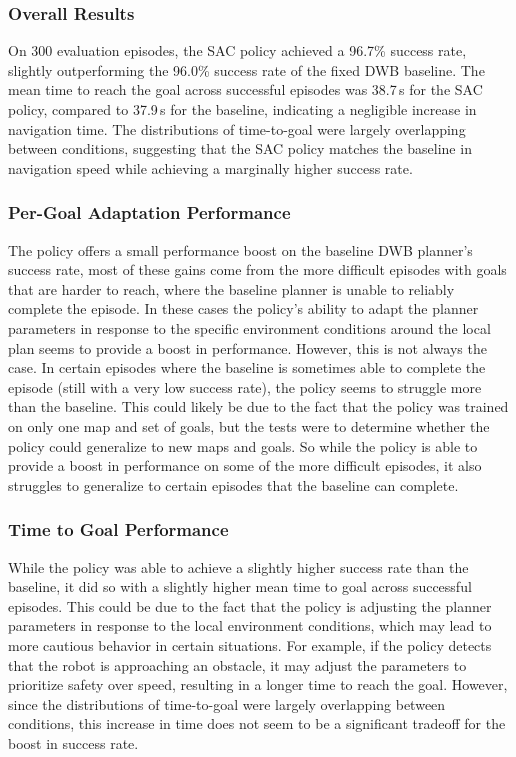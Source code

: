 \documentclass[conference]{IEEEtran}
\begin{document}
        \subsubsection{Overall Results}
        On 300 evaluation episodes, the SAC policy achieved a 96.7\% success rate, slightly outperforming the 96.0\% success rate of the fixed DWB baseline. The mean time to reach the goal across successful episodes was 38.7\,s for the SAC policy, compared to 37.9\,s for the baseline, indicating a negligible increase in navigation time. The distributions of time-to-goal were largely overlapping between conditions, suggesting that the SAC policy matches the baseline in navigation speed while achieving a marginally higher success rate.

        \subsubsection{Per-Goal Adaptation Performance}
        The policy offers a small performance boost on the baseline DWB planner's success rate, most of these gains come from the more difficult episodes with goals that are harder to reach, where the baseline planner is unable to reliably complete the episode. In these cases the policy's ability to adapt the planner parameters in response to the specific environment conditions around the local plan seems to provide a boost in performance. However, this is not always the case. In certain episodes where the baseline is sometimes able to complete the episode (still with a very low success rate), the policy seems to struggle more than the baseline. This could likely be due to the fact that the policy was trained on only one map and set of goals, but the tests were to determine whether the policy could generalize to new maps and goals. So while the policy is able to provide a boost in performance on some of the more difficult episodes, it also struggles to generalize to certain episodes that the baseline can complete.

        \subsubsection{Time to Goal Performance}
        While the policy was able to achieve a slightly higher success rate than the baseline, it did so with a slightly higher mean time to goal across successful episodes. This could be due to the fact that the policy is adjusting the planner parameters in response to the local environment conditions, which may lead to more cautious behavior in certain situations. For example, if the policy detects that the robot is approaching an obstacle, it may adjust the parameters to prioritize safety over speed, resulting in a longer time to reach the goal. However, since the distributions of time-to-goal were largely overlapping between conditions, this increase in time does not seem to be a significant tradeoff for the boost in success rate.
\end{document}
